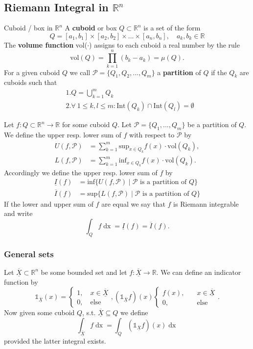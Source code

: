 \documentclass[a4paper,fontsize = 10pt]{article}
\def\R{\mathbb{R}}
\def\X{\underline{\overline{X}}}
\def\P{\mathcal{P}}
\begin{document}
\subsection{Riemann Integral in \texorpdfstring{\(\R^n\)}{Rⁿ}}
\begin{subbox}{Cuboid / box in $\R^n$}
    A \textbf{cuboid} or box $Q \subset \R^n$ is a set of the form
    $$Q = [a_1, b_1] \times [a_2,b_2] \times ... \times [a_n,b_n], \quad a_k, b_k \in \R$$
    The \textbf{volume function} vol($\cdot$) assigns to each cuboid a real number by the rule 
    $$\text{vol}(Q) = \prod_{k = 1}^{n}(b_k - a_k) = \mu(Q).$$
    For a given cuboid $Q$ we call $\P = \{Q_1, Q_2, ..., Q_m\}$ a \textbf{partition} of $Q$ if the $Q_k$ are cuboids such that
    \begin{align*}
        &1. Q = \bigcup_{k = 1}^{m} Q_k\\
        &2. \forall \ 1 \leq k,l \leq m: \text{Int}(Q_k) \cap \text{Int}(Q_l) = \emptyset
    \end{align*}
\end{subbox}
Let $f: Q \subset \R^n \to \R$ for some cuboid $Q$. Let $\P = \{Q_1, ...,Q_m\}$ be a partition of $Q$. We define the upper resp. lower sum of $f$ with respect to $\P$ by 
\begin{align*}
    U(f, \P) &= \sum_{k = 1}^{m} \text{sup}_{x \in Q_k} f(x) \cdot \text{vol}(Q_k),\\
    L(f, \P) &= \sum_{k = 1}^{m} \text{inf}_{x \in Q_k} f(x) \cdot \text{vol}(Q_k).
\end{align*}
Accordingly we define the upper resp. lower sum of $f$ by 
\begin{align*}
    \underline{I}(f) &= \text{inf}\{U(f, \P) \mid \P \text{ is a partition of } Q\}\\
    \overline{I}(f) &= \text{sup}\{L(f, \P) \mid \P \text{ is a partition of } Q\}
\end{align*}
If the lower and upper sum of $f$ are equal we say that $f$ is Riemann integrable and write
$$\int_Q f \mathop{dx} = \underline{I}(f) = \overline{I}(f).$$

\subsubsection{General sets}
Let $\X \subset \R^n$ be some bounded set and let $f: \X \to \R$. We can define an indicator function by
\[\mathds{1}_{\X}(x) = 
\begin{cases}
    1, \quad x \in \X\\
    0, \quad \text{else}
\end{cases}, 
(\mathds{1}_{\X} f)(x) 
\begin{cases}
    f(x), \quad& x \in \X\\
    0, \quad& \text{else} 
\end{cases}.\]
Now given some cuboid $Q$, s.t. $\X \subseteq Q$ we define 
\[\int_{\X}f \mathop{dx} = \int_{Q}(\mathds{1}_{\X}f)(x)\mathop{dx}\]
provided the latter integral exists. 
\end{document}
